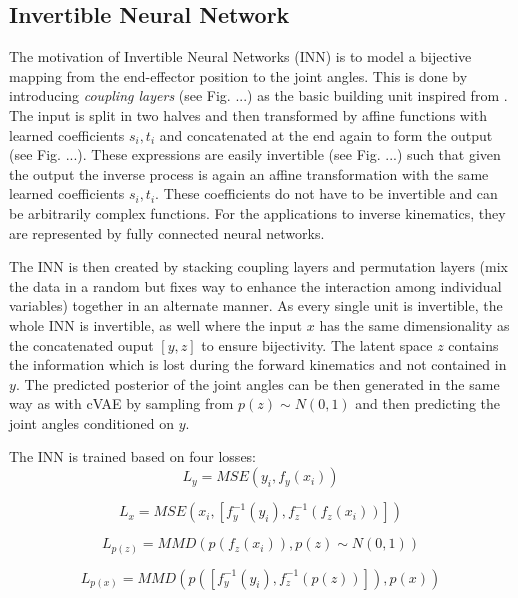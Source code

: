 \documentclass[conference]{IEEEtran}
\begin{document}
\subsection*{Invertible Neural Network}
The motivation of Invertible Neural Networks (INN) \cite{Ardizzone2018} is to model a bijective mapping from the end-effector position to the joint angles. This is done by introducing \textit{coupling layers} (see Fig. ...) as the basic building unit inspired from \cite{Dinh2016}.
The input is split in two halves and then transformed by affine functions with learned coefficients $s_i, t_i$ and concatenated at the end again to form the output (see Fig. ...). These expressions are easily invertible (see Fig. ...) such that given the output the inverse process is again an affine transformation with the same learned coefficients $s_i, t_i$. These coefficients do not have to be invertible and can be arbitrarily complex functions. For the applications to inverse kinematics, they are represented by fully connected neural networks.

The INN is then created by stacking coupling layers and permutation layers (mix the data in a random but fixes way to enhance the interaction among individual variables) together in an alternate manner. As every single unit is invertible, the whole INN is invertible, as well where the input $x$ has the same dimensionality as the concatenated ouput $[y, z]$ to ensure bijectivity. The latent space $z$ contains the information which is lost during the forward kinematics and not contained in $y$. The predicted posterior of the joint angles can be then generated in the same way as with cVAE by sampling from $p(z) \sim N(0, 1)$ and then predicting the joint angles conditioned on $y$.

The INN is trained based on four losses:
\begin{equation}
    L_y = MSE(y_i, f_y(x_i))
    \label{L_y}
\end{equation}

\begin{equation}
    L_x = MSE(x_i, [f_y^{-1}(y_i),f_z^{-1}(f_z(x_i))])
    \label{L_xy}
\end{equation}

\begin{equation}
    L_{p(z)} = MMD(p(f_z(x_i)), p(z)\sim N(0, 1))
    \label{L_z}
\end{equation}

\begin{equation}
    L_{p(x)} = MMD(p([f_y^{-1}(y_i), f_z^{-1}(p(z))]), p(x))
    \label{L_x}
\end{equation}
\end{document}
